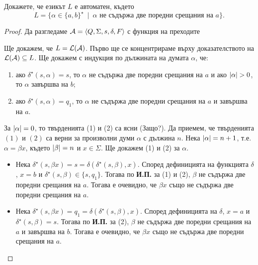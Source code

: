 \begin{problem}
  Докажете, че езикът $L$ е автоматен, където
  \[L = \{\alpha \in \{a,b\}^\star\ \mid\ \alpha\mbox{ не съдържа две поредни срещания на }a\}.\]
\end{problem}
\begin{proof}
  Да разгледаме $\mathcal{A} = \langle{Q,\Sigma,s,\delta,F}\rangle$ с функция на преходите
  \begin{figure}[H]
    \begin{center}
    \end{center}
 \end{figure}

 Ще докажем, че $L = \mathcal{L}(\mathcal{A})$.
 Първо ще се концентрираме върху доказателството на $\mathcal{L}(\mathcal{A}) \subseteq L$.
 Ще докажем с индукция по дължината на думата $\alpha$, че:
 \begin{enumerate}[(1)]
 \item 
   ако $\delta^\star(s,\alpha) = s$, то
   $\alpha$ не съдържа две поредни срещания на $a$
   и ако $\lvert{\alpha}\rvert > 0$, то $\alpha$ завършва на $b$;
 \item
   ако $\delta^\star(s,\alpha) = q_1$, то
   $\alpha$ не съдържа две поредни срещания на $a$
   и завършва на $a$.
 \end{enumerate}

 За $\lvert{\alpha}\rvert = 0$, то твърденията (1) и (2) са ясни (Защо?).
 Да приемем, че твърденията $(1)$ и $(2)$ са верни за произволни думи $\alpha$ с дължина $n$.
 Нека $\lvert{\alpha}\rvert = n+1$, т.е. $\alpha = \beta x$, където $\lvert{\beta}\rvert = n$ и $x \in \Sigma$.
 Ще докажем (1) и (2) за $\alpha$.
 \begin{itemize}[-]
 \item 
   Нека $\delta^\star(s,\beta x) = s = \delta(\delta^\star(s,\beta),x)$.
   Според дефиницията на функцията $\delta$, $x = b$ и $\delta^\star(s,\beta) \in \{s,q_1\}$.
   Тогава по {\bf И.П.} за (1) и (2), $\beta$ не съдържа две поредни срещания на $a$.
   Тогава е очевидно, че $\beta x$ също не съдържа две поредни срещания на $a$.
 \item
   Нека $\delta^\star(s,\beta x) = q_1 = \delta(\delta^\star(s,\beta),x)$.
   Според дефиницията на $\delta$, $x = a$ и $\delta^\star(s,\beta) = s$.
   Тогава по {\bf И.П.} за (2), $\beta$ не съдържа две поредни срещания на $a$
   и завършва на $b$.
   Тогава е очевидно, че $\beta x$ също не съдържа две поредни срещания на $a$.
 \end{itemize}
 

\end{proof}
